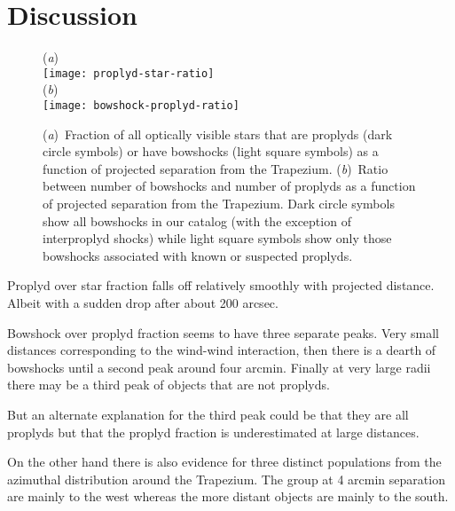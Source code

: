 \documentclass[apj, twocolumn]{aastex63}
\renewcommand\clearpage{}
\begin{document}
\clearpage
\section{Discussion}
\label{sec:discuss}
\begin{figure}
  (\textit{a})\\
  \texttt{[image: proplyd-star-ratio]}\\
  (\textit{b})\\
  \texttt{[image: bowshock-proplyd-ratio]}
  \caption{(\textit{a})~Fraction of all optically visible stars that
    are proplyds (dark circle symbols) or have bowshocks (light square
    symbols) as a function of projected separation from the Trapezium.
    (\textit{b})~Ratio between number of bowshocks and number of
    proplyds as a function of projected separation from the Trapezium.
    Dark circle symbols show all bowshocks in our catalog (with the
    exception of interproplyd shocks) while light square symbols show
    only those bowshocks associated with known or suspected proplyds.
  }
  \label{fig:bow-proplyd-star-ratios}
\end{figure}

Proplyd over star fraction falls off relatively smoothly with
projected distance.  Albeit with a sudden drop after about
200 arcsec.


Bowshock over proplyd fraction seems to have three separate peaks.
Very small distances corresponding to the wind-wind interaction,
then there is a dearth of bowshocks until a second peak around
four arcmin.  Finally at very large radii there may be a third
peak of objects that are not proplyds.

But an alternate explanation for the third peak could be that
they are all proplyds but that the proplyd fraction is
underestimated at large distances.

On the other hand there is also evidence for three distinct
populations from the azimuthal distribution around the Trapezium.
The group at 4 arcmin separation are mainly to the west whereas
the more distant objects are mainly to the south.
\end{document}
